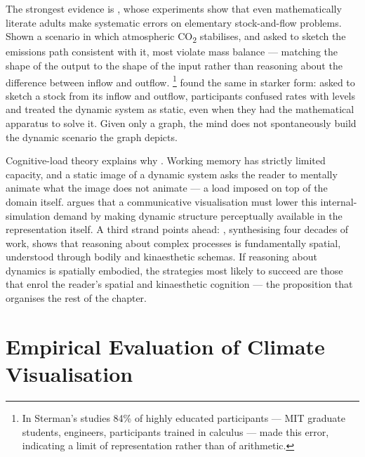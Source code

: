 The strongest evidence is \citet{sterman2008}, whose experiments show that even mathematically literate adults make systematic errors on elementary stock-and-flow problems. Shown a scenario in which atmospheric CO\textsubscript{2} stabilises, and asked to sketch the emissions path consistent with it, most violate mass balance --- matching the shape of the output to the shape of the input rather than reasoning about the difference between inflow and outflow.
\footnote{In Sterman's studies 84\% of highly educated participants --- MIT graduate students, engineers, participants trained in calculus --- made this error, indicating a limit of representation rather than of arithmetic.} \citet{cronin2009} found the same in starker form: asked to sketch a stock from its inflow and outflow, participants confused rates with levels and treated the dynamic system as static, even when they had the mathematical apparatus to solve it. Given only a graph, the mind does not spontaneously build the dynamic scenario the graph depicts.



Cognitive-load theory explains why \citep{sweller1988, swellervanmerrienboer2019}. Working memory has strictly limited capacity, and a static image of a dynamic system asks the reader to mentally animate what the image does not animate --- a load imposed on top of the domain itself. \citet{ware2021} argues that a communicative visualisation must lower this internal-simulation demand by making dynamic structure perceptually available in the representation itself. A third strand points ahead: \citet{tversky2019}, synthesising four decades of work, shows that reasoning about complex processes is fundamentally spatial, understood through bodily and kinaesthetic schemas. If reasoning about dynamics is spatially embodied, the strategies most likely to succeed are those that enrol the reader's spatial and kinaesthetic cognition --- the proposition that organises the rest of the chapter.

\section{Empirical Evaluation of Climate Visualisation}
\label{sec:empirical-viz}

